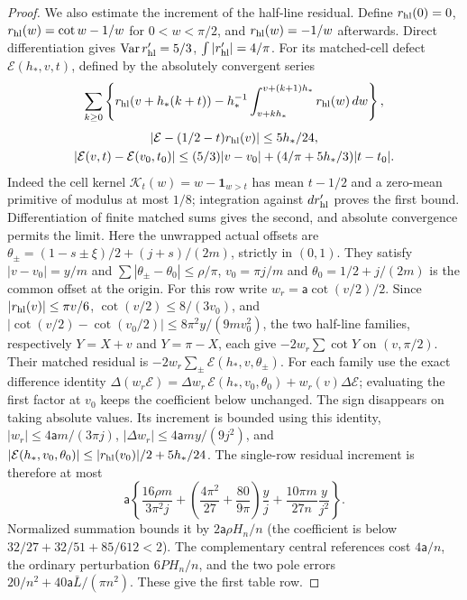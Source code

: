\begin{proof}
We also estimate the increment of the half-line residual. Define $r_{\rm hl}(0)=0$,
$r_{\rm hl}(w)=\cot w-1/w$ for $0<w<\pi/2$, and $r_{\rm hl}(w)=-1/w$ afterwards.
Direct differentiation gives
$\operatorname{Var}r_{\rm hl}'=5/3$, $\int|r_{\rm hl}'|=4/\pi$.
For its matched-cell defect $\mathcal E(h_*,v,t)$,
defined by the absolutely convergent series
\[
 \sum_{k\geq0}\left\{r_{\rm hl}(v+h_*(k+t))
       -h_*^{-1}\int_{v+kh_*}^{v+(k+1)h_*}r_{\rm hl}(w)\,dw\right\},
\]
\[
 \begin{gathered}
 |\mathcal E-(1/2-t)r_{\rm hl}(v)|\leq5h_*/24,\\
 |\mathcal E(v,t)-\mathcal E(v_0,t_0)|
 \leq(5/3)|v-v_0|+(4/\pi+5h_*/3)|t-t_0|.
 \end{gathered}
\]
Indeed the cell kernel $\mathcal K_t(w)=w-\mathbf1_{w>t}$ has mean
$t-1/2$ and a zero-mean primitive of modulus at most $1/8$;
integration against $dr_{\rm hl}'$ proves the first bound. Differentiation of
finite matched sums gives the second, and absolute convergence permits
the limit. Here the unwrapped actual offsets are
$\theta_\pm=(1-s\pm\xi)/2+(j+s)/(2m)$, strictly in $(0,1)$.
They satisfy $|v-v_0|=y/m$ and
$\sum|\theta_\pm-\theta_0|\leq\rho/\pi$, $v_0=\pi j/m$ and $\theta_0=1/2+j/(2m)$
is the common offset at the origin.
For this row write $w_r=\mathsf a\cot(v/2)/2$. Since $|r_{\rm hl}(v)|\leq\pi v/6$,
$\cot(v/2)\leq8/(3v_0)$, and
$|\cot(v/2)-\cot(v_0/2)|\leq8\pi^2y/(9mv_0^2)$,
the two half-line families, respectively $Y=X+v$ and $Y=\pi-X$,
each give $-2w_r\sum\cot Y$ on $(v,\pi/2)$. Their matched residual is
$-2w_r\sum_\pm\mathcal E(h_*,v,\theta_\pm)$.
For each family use the exact difference identity
$\Delta(w_r\mathcal E)=\Delta w_r\,\mathcal E(h_*,v_0,\theta_0)
+w_r(v)\Delta\mathcal E$; evaluating the first factor at $v_0$
keeps the coefficient below unchanged. The sign disappears on taking
absolute values. Its increment is bounded using this identity,
$|w_r|\leq4\mathsf a m/(3\pi j)$,
$|\Delta w_r|\leq4\mathsf a my/(9j^2)$, and
$|\mathcal E(h_*,v_0,\theta_0)|\leq|r_{\rm hl}(v_0)|/2+5h_*/24$.
The single-row residual increment is therefore at most
\[
 \mathsf{a}\left\{\frac{16\rho m}{3\pi^2j}
 +\left(\frac{4\pi^2}{27}+\frac{80}{9\pi}\right)\frac yj
 +\frac{10\pi m}{27n}\frac y{j^2}\right\}.
\]
Normalized summation bounds it by $2\mathsf{a}\rho H_n/n$
(the coefficient is below $32/27+32/51+85/612<2$).
The complementary central references cost $4\mathsf{a}/n$, the ordinary
perturbation $6PH_n/n$, and the two pole errors
$20/n^2+40\mathsf{a}\bar{L}/(\pi n^2)$. These give the first table row.


\end{proof}
